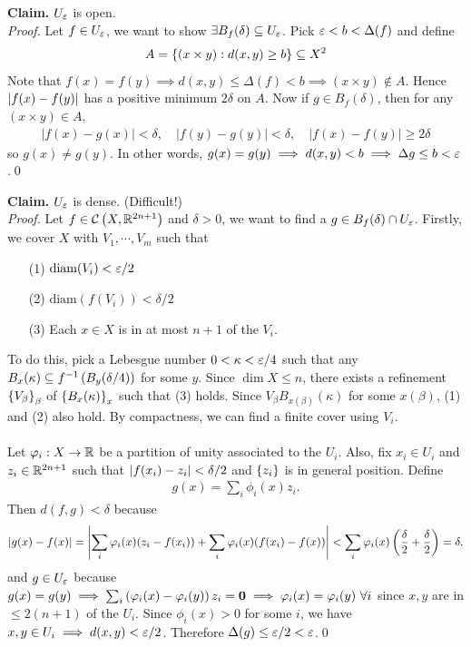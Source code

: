 \documentclass{natsirt}
\newcommand{\x}{\\ \phantom{a} \\}
\newcounter{def}[section]
\begin{document}
\begin{whitebox}
    \textbf{Claim.} $U_\varepsilon$ is open. \vspace{0.5cm}\\
    \textit{Proof.} Let $f\in U_\varepsilon$, we want to show $\exists B_f(\delta)\subseteq U_\varepsilon$. Pick $\varepsilon < b < \Delta(f)$ and define
    \begin{align*}
        A = \left\{ (x\times y): d(x,y) \geq b \right\} \subseteq X^2
    \end{align*}
    Note that $f(x)=f(y) \implies d(x,y) \leq \Delta(f) < b \implies (x\times y)\not\in A$. Hence $\left| f(x)-f(y)\right|$ has a positive minimum $2\delta$ on $A$. Now if $g\in B_f(\delta)$, then for any $(x\times y)\in A$,
    \begin{align*}
        |f(x)-g(x)| < \delta,\quad |f(y)-g(y)| < \delta,\quad |f(x)-f(y)|\geq 2\delta
    \end{align*}
    so $g(x)\neq g(y)$. In other words, $g(x)=g(y)\implies d(x,y)<b \implies \Delta g \leq b < \varepsilon$.\qed
\end{whitebox}
\begin{whitebox}
    \textbf{Claim.} $U_\varepsilon$ is dense. (Difficult!) \vspace{0.5cm}\\
    \textit{Proof.} Let $f\in \mathcal{C}\left( X,\mathbb{R}^{2n+1} \right)$ and $\delta>0$, we want to find a $g\in B_f(\delta)\cap U_\varepsilon$. Firstly, we cover $X$ with $V_1,\cdots,V_m$ such that
    \begin{itemize}
        \item[(1)] $\text{diam}(V_i) < \varepsilon/2$
        \item[(2)] $\text{diam}(f(V_i)) < \delta/2$
        \item[(3)] Each $x\in X$ is in at most $n+1$ of the $V_i$.
    \end{itemize}
    To do this, pick a Lebesgue number $0<\kappa<\varepsilon/4$ such that any $B_x(\kappa)\subseteq f^{-1}\left( B_y(\delta/4) \right)$ for some $y$. Since $\dim X\leq n$, there exists a refinement $\left\{ V_\beta \right\}_\beta$ of $\left\{ B_x(\kappa) \right\}_x$ such that (3) holds. Since $V_\beta B_{x(\beta)}(\kappa)$ for some $x(\beta)$, (1) and (2) also hold. By compactness, we can find a finite cover using $V_i$.
    \x
    Let $\varphi_i: X\rightarrow \mathbb{R}$ be a partition of unity associated to the $U_i$. Also, fix $x_i\in U_i$ and $z_i\in \mathbb{R}^{2n+1}$ such that $\left| f(x_i)-z_i\right|<\delta/2$ and $\left\{ z_i \right\}$ is in general position. Define
    \begin{align*}
        g(x) = \sum_{i} \phi_i(x) z_i.
    \end{align*}
    Then $d(f,g)<\delta$ because
    \begin{align*}
        \left| g(x)-f(x)\right|=\left| \sum_i \varphi_i(x) (z_i-f(x_i)) + \sum_i \varphi_i(x) (f(x_i)-f(x))\right|< \sum_i \varphi_i(x) \left( \frac{\delta}{2}+\frac{\delta}{2} \right)=\delta.
    \end{align*}
    and $g\in U_\varepsilon$ because $g(x)=g(y)\implies \sum_i \left( \varphi_i(x)-\varphi_i(y) \right)z_i = \textbf{0}\implies \varphi_i(x)=\varphi_i(y) \ \forall i$ since $x,y$ are in $\leq 2(n+1)$ of the $U_i$. Since $\phi_i(x)>0$ for some $i$, we have $x,y\in U_i \implies d(x,y)<\varepsilon/2$. Therefore $\Delta(g)\leq \varepsilon/2<\varepsilon$.\qed
\end{whitebox}
\end{document}
